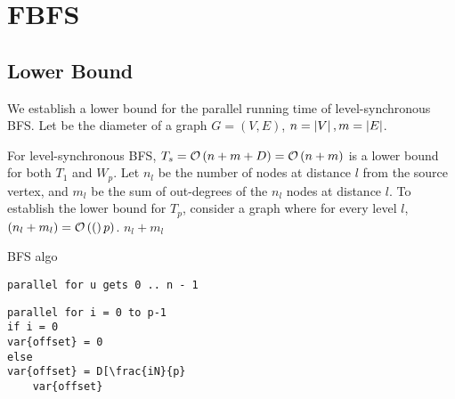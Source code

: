 \section{FBFS}

\subsection{Lower Bound}
We establish a lower bound for the parallel running time of level-synchronous BFS.
Let  be the diameter of a graph $G=(V,E)$, $n=\left|V\right|, m=\left|E\right|$.

For level-synchronous BFS, $T_s={\mathcal O}\left({n+m+D}\right)={\mathcal O}\left({n+m}\right)$ is a lower bound for both $T_1$ and $W_p$. 
Let $n_l$ be the number of nodes at distance $l$ from the source vertex, and $m_l$ be the sum of out-degrees
of the $n_l$ nodes at distance $l$.
To establish the lower bound for $T_p$, consider a graph where for every level $l$, $(n_l+m_l) = {\mathcal O}\left({(}\right)p)$.
$n_l+m_l$ 

BFS algo
\begin{verbatim}
parallel for u gets 0 .. n - 1
\end{verbatim}

\begin{verbatim}
parallel for i = 0 to p-1
if i = 0
var{offset} = 0
else
var{offset} = D[\frac{iN}{p}
    var{offset}


    \end{verbatim}

